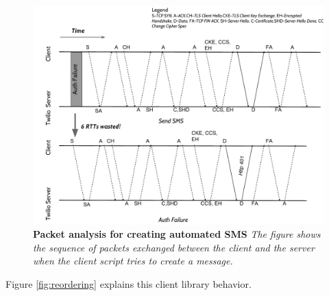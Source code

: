 \begin{figure}[t!] \centering
\includegraphics[width=\textwidth]{figs/authfailure.pdf}
\caption{\textbf{Packet analysis for creating automated SMS} {\footnotesize\textit{
The figure shows the sequence of packets exchanged between the client and the server when the client script tries to create a message.
}}}
\label{fig:authfailure}
\end{figure}

Figure {\ref{fig:reordering}} explains this client library behavior. 